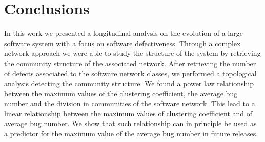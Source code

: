 \section{Conclusions}
\label{Conclusions}
In this work we presented a longitudinal analysis on the evolution of a large software system with a focus on software defectiveness.
Through a complex network approach we were able to study the structure of 
the system by retrieving the community structure of the associated 
network. After retrieving the number of defects associated to the 
software network classes, we performed a topological analysis detecting the 
community structure. 
We found a power law relationship between the maximum values of the clustering coefficient, the average bug number and the division in communities of the software network. This lead to a linear relationship between the maximum values of clustering coefficient and of average bug number.
We show that such relationship can in principle be used as a predictor for the maximum value of the average bug number in future releases. 
